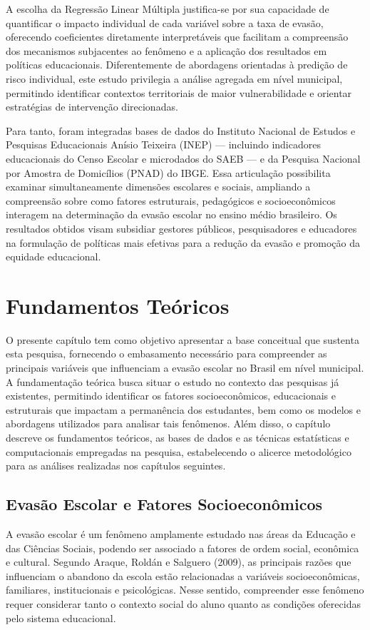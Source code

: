 \documentclass[english, spanish, brazilian]{RBIEarticle} %
\begin{document}
A escolha da Regressão Linear Múltipla justifica-se por sua capacidade de quantificar o impacto individual de cada variável sobre a taxa de evasão, oferecendo coeficientes diretamente interpretáveis que facilitam a compreensão dos mecanismos subjacentes ao fenômeno e a aplicação dos resultados em políticas educacionais. Diferentemente de abordagens orientadas à predição de risco individual, este estudo privilegia a análise agregada em nível municipal, permitindo identificar contextos territoriais de maior vulnerabilidade e orientar estratégias de intervenção direcionadas.

Para tanto, foram integradas bases de dados do Instituto Nacional de Estudos e Pesquisas Educacionais Anísio Teixeira (INEP) — incluindo indicadores educacionais do Censo Escolar e microdados do SAEB — e da Pesquisa Nacional por Amostra de Domicílios (PNAD) do IBGE. Essa articulação possibilita examinar simultaneamente dimensões escolares e sociais, ampliando a compreensão sobre como fatores estruturais, pedagógicos e socioeconômicos interagem na determinação da evasão escolar no ensino médio brasileiro. Os resultados obtidos visam subsidiar gestores públicos, pesquisadores e educadores na formulação de políticas mais efetivas para a redução da evasão e promoção da equidade educacional.



\section{Fundamentos Teóricos}

O presente capítulo tem como objetivo apresentar a base conceitual que sustenta esta pesquisa, fornecendo o embasamento necessário para compreender as principais variáveis que influenciam a evasão escolar no Brasil em nível municipal. A fundamentação teórica busca situar o estudo no contexto das pesquisas já existentes, permitindo identificar os fatores socioeconômicos, educacionais e estruturais que impactam a permanência dos estudantes, bem como os modelos e abordagens utilizados para analisar tais fenômenos. Além disso, o capítulo descreve os fundamentos teóricos, as bases de dados e as técnicas estatísticas e computacionais empregadas na pesquisa, estabelecendo o alicerce metodológico para as análises realizadas nos capítulos seguintes.
\subsection{Evasão Escolar e Fatores Socioeconômicos}
A evasão escolar é um fenômeno amplamente estudado nas áreas da Educação e das Ciências Sociais, podendo ser associado a fatores de ordem social, econômica e cultural. Segundo Araque, Roldán e Salguero (2009), as principais razões que influenciam o abandono da escola estão relacionadas a variáveis socioeconômicas, familiares, institucionais e psicológicas. Nesse sentido, compreender esse fenômeno requer considerar tanto o contexto social do aluno quanto as condições oferecidas pelo sistema educacional.
\end{document}
